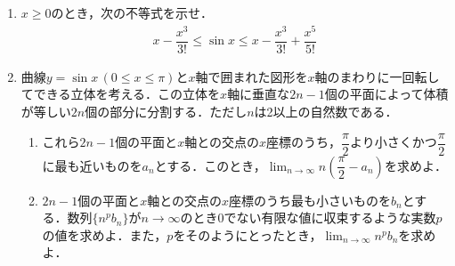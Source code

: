 \documentclass[../../main.tex]{subfiles}
\begin{document}
\begin{enumerate}
  \item $x\ge 0$のとき，次の不等式を示せ．
    \begin{align*}
      x-\dfrac{x^3}{3!}\le \sin x \le  x-\dfrac{x^3}{3!}+\dfrac{x^5}{5!}
    \end{align*}
  \item 曲線$y=\sin x\, (0\le x\le \pi)$と$x$軸で囲まれた図形を$x$軸のまわりに一回転してできる立体を考える．この立体を$x$軸に垂直な$2n-1$個の平面によって体積が等しい$2n$個の部分に分割する．ただし$n$は2以上の自然数である．
    \begin{enumerate}
      \item これら$2n-1$個の平面と$x$軸との交点の$x$座標のうち，$\dfrac{\pi}{2}$より小さくかつ$\dfrac{\pi}{2}$に最も近いものを$a_n$とする．このとき，$\lim_{n\to\infty} n(\dfrac{\pi}{2}-a_n)$を求めよ．
      \item $2n-1$個の平面と$x$軸との交点の$x$座標のうち最も小さいものを$b_n$とする．数列$\{n^pb_n\}$が$n\to\infty$のとき$0$でない有限な値に収束するような実数$p$の値を求めよ．また，$p$をそのようにとったとき，$\lim_{n\to\infty}n^pb_n$を求めよ．
    \end{enumerate}
\end{enumerate}
\end{document}
